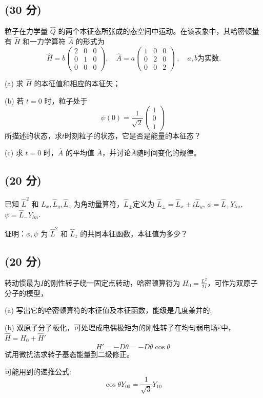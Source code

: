  \subsection{(30 分)}
 粒子在力学量 $\hat{Q}$ 的两个本征态所张成的态空间中运动。在该表象中，其哈密顿量有 $\hat{H}$ 和一力学算符 $\hat{A}$ 的形式为
$$
\hat{H} = b \begin{pmatrix}
2 & 0 & 0 \\
0 & 1 & 0 \\
0 & 0 & 0 
\end{pmatrix}, \quad \hat{A} = a \begin{pmatrix}
1 & 0 & 0 \\
0 & 2 & 0 \\
0 & 0 & 2 
\end{pmatrix}~, \quad a, b \text{为实数}.
$$

(a) 求 $\hat{H}$ 的本征值和相应的本征矢；

(b) 若 $t = 0$ 时，粒子处于
$$
\psi(0) = \frac{1}{\sqrt{2}} \begin{pmatrix}
1 \\
0 \\
1
\end{pmatrix}~
$$
所描述的状态，求$t$时刻粒子的状态，它是否是能量的本征态？

(c) 求 $t = 0$ 时，$\hat{A}$ 的平均值 $\overline{A}$，并讨论$\overline{A}$随时间变化的规律。
\subsection{(20 分)}
已知 $\hat{L}^2$ 和 $\hat{L}_x, \hat{L}_y, \hat{L}_z$ 为角动量算符，$\hat{L}_\pm$定义为 $\hat{L}_\pm = \hat{L}_x \pm i\hat{L}_y$, $\phi = \hat{L}_+ Y_{lm}$, $\psi = \hat{L}_- Y_{lm}$.

证明：$\phi, \psi$ 为 $\hat{L}^2$ 和 $\hat{L}_z$ 的共同本征函数，本征值为多少？
\subsection{(20 分)}
转动惯最为$I$的刚性转子绕一固定点转动，哈密顿算符为 $H_0 = \frac{L^2}{2I}$，可作为双原子分子的模型，

(a) 写出它的哈密顿算符的本征值及本征函数，能级是几度兼并的:

(b) 双原子分子板化，可处理成电偶极矩为的刚性转子在均匀弱电场$\hat\varepsilon$中，$\hat H = H_0 + \hat H'$ 
$$
H' = -D \dot{\theta} = -D \dot{\theta} \cos \theta~
$$
试用微扰法求转子基态能量到二级修正。

可能用到的递推公式:
$$\cos\theta Y_{00} = \frac{1}{\sqrt{3}} Y_{10}~$$